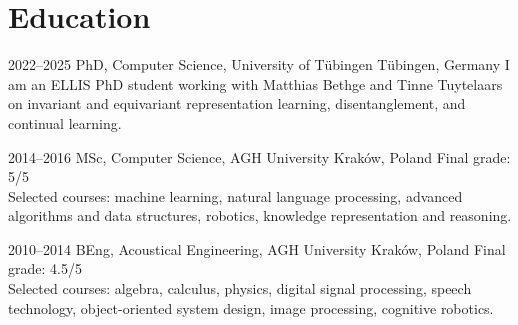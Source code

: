 \documentclass[]{friggeri-cv_osx}
\begin{document}
\section{Education}
\begin{entrylist}

\entry
{2022–2025}
{PhD, Computer Science, University of Tübingen}
{Tübingen, Germany}
{I am an ELLIS PhD student working with Matthias Bethge and Tinne Tuytelaars on invariant and equivariant representation learning, disentanglement, and continual learning.\\}

\entry
{2014–2016}
{MSc, Computer Science, AGH University}
{Kraków, Poland}
{Final grade: 5/5\\
Selected courses: machine learning, natural language processing, advanced algorithms and data structures, robotics, knowledge representation and reasoning.\\}

\entry
{2010–2014}
{BEng, Acoustical Engineering, AGH University}
{Kraków, Poland}
{Final grade: 4.5/5\\
Selected courses: algebra, calculus, physics, digital signal processing, speech technology, object-oriented system design, image processing, cognitive robotics.}
\end{entrylist}


\newpage
\end{document}
